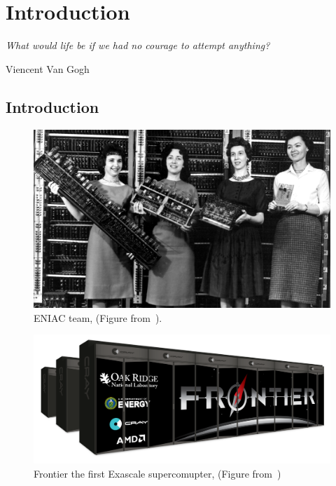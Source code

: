 \pagestyle{fancy}
\fancyhead{}
\fancyfoot{}
\fancyfoot[RO,LE]{\thepage}



\chapter{Introduction}\label{chap:intro}
\vspace{20mm}
\epigraph{\textit{ What would life be if we had no courage to attempt anything?}} {Viencent Van Gogh}

\newpage

\section{Introduction}

\begin{figure}[hb]\centering
\includegraphics[scale=0.4]{figures/ENIAC-team.png}
\caption{ENIAC team, (Figure from~\cite{eniac}).}
\label{figeniac}
\end{figure}

\begin{figure}[tb]\centering
\includegraphics[scale=0.22]{figures/Frontier.original.png}
\caption{Frontier the first Exascale supercomupter, (Figure from~\cite{frontier-image})}
\label{figfrontier}
\end{figure}



